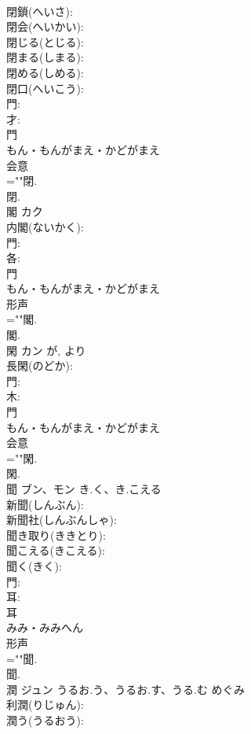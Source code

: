 \documentclass[8pt]{extreport}
\begin{document}
\begin{CJK}{UTF8}{min}
\\	閉鎖(へいさ): 
\\	閉会(へいかい): 
\\	閉じる(とじる): 
\\	閉まる(しまる): 
\\	閉める(しめる): 
\\	閉口(へいこう): 
\\	門: 
\\	才: 
\\	門	
\\	もん・もんがまえ・かどがまえ	
\\	会意 
\\	=""閉.
\\	閉.
\\	閣	カク			
\\	内閣(ないかく): 
\\	門: 
\\	各: 
\\	門	
\\	もん・もんがまえ・かどがまえ	
\\	形声 
\\	=""閣.
\\	閣.
\\	閑	カン		が, より	
\\	長閑(のどか): 
\\	門: 
\\	木: 
\\	門	
\\	もん・もんがまえ・かどがまえ	
\\	会意 
\\	=""閑.
\\	閑.
\\	聞	ブン、モン	き.く、き.こえる		
\\	新聞(しんぶん): 
\\	新聞社(しんぶんしゃ): 
\\	聞き取り(ききとり): 
\\	聞こえる(きこえる): 
\\	聞く(きく): 
\\	門: 
\\	耳: 
\\	耳	
\\	みみ・みみへん	
\\	形声 
\\	=""聞.
\\	聞.
\\	潤	ジュン	うるお.う、うるお.す、うる.む	めぐみ	
\\	利潤(りじゅん): 
\\	潤う(うるおう): 

\end{CJK}
\end{document}
